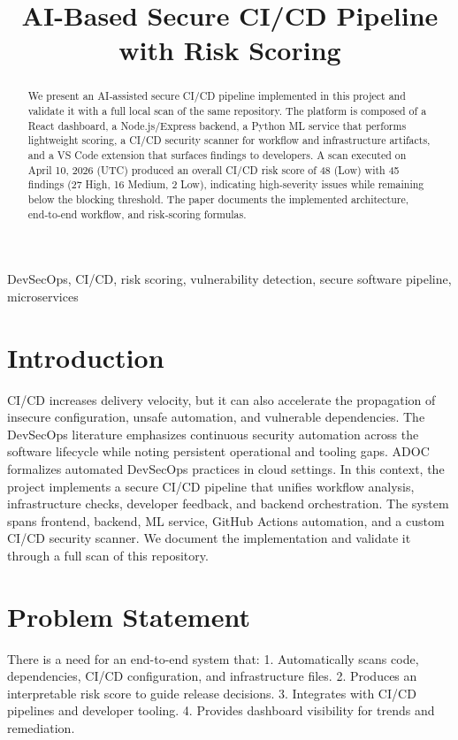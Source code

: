 \documentclass[conference]{IEEEtran}
\title{AI-Based Secure CI/CD Pipeline with Risk Scoring}
\author{
\IEEEauthorblockN{Author Name}
\IEEEauthorblockA{Department\\
University\\
City, Country\\
email@domain.com}
}
\begin{document}
\maketitle

\begin{abstract}
We present an AI‑assisted secure CI/CD pipeline implemented in this project and validate it with a full local scan of the same repository. The platform is composed of a React dashboard, a Node.js/Express backend, a Python ML service that performs lightweight scoring, a CI/CD security scanner for workflow and infrastructure artifacts, and a VS Code extension that surfaces findings to developers. A scan executed on April 10, 2026 (UTC) produced an overall CI/CD risk score of 48 (Low) with 45 findings (27 High, 16 Medium, 2 Low), indicating high‑severity issues while remaining below the blocking threshold. The paper documents the implemented architecture, end‑to‑end workflow, and risk‑scoring formulas.
\end{abstract}

\begin{IEEEkeywords}
DevSecOps, CI/CD, risk scoring, vulnerability detection, secure software pipeline, microservices
\end{IEEEkeywords}

\section{Introduction}
CI/CD increases delivery velocity, but it can also accelerate the propagation of insecure configuration, unsafe automation, and vulnerable dependencies. The DevSecOps literature emphasizes continuous security automation across the software lifecycle while noting persistent operational and tooling gaps.\cite{ref_mohammed2025,ref_rajapakse2021,ref_prates2024,ref_zhao2024} ADOC formalizes automated DevSecOps practices in cloud settings.\cite{ref_kumar2020} In this context, the project implements a secure CI/CD pipeline that unifies workflow analysis, infrastructure checks, developer feedback, and backend orchestration. The system spans frontend, backend, ML service, GitHub Actions automation, and a custom CI/CD security scanner. We document the implementation and validate it through a full scan of this repository.

\section{Problem Statement}
There is a need for an end-to-end system that:
1. Automatically scans code, dependencies, CI/CD configuration, and infrastructure files.
2. Produces an interpretable risk score to guide release decisions.
3. Integrates with CI/CD pipelines and developer tooling.
4. Provides dashboard visibility for trends and remediation.
\end{document}
